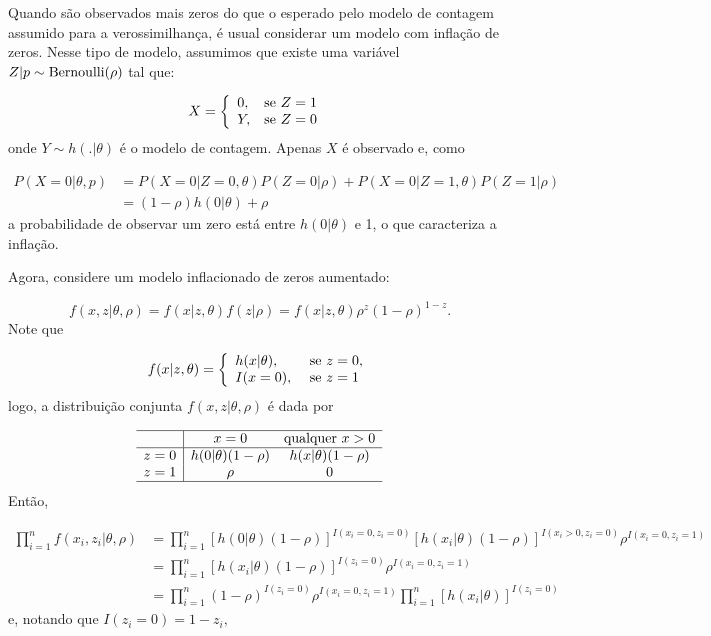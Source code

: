 \documentclass[
  letterpaper,
  DIV=11,
  numbers=noendperiod]{scrreprt}
\theoremstyle{definition}
\theoremstyle{definition}
\theoremstyle{plain}
\theoremstyle{remark}
\begin{document}
Quando são observados mais zeros do que o esperado pelo modelo de
contagem assumido para a verossimilhança, é usual considerar um modelo
com inflação de zeros. Nesse tipo de modelo, assumimos que existe uma
variável \(Z|p\sim\hbox{Bernoulli}(\rho)\) tal que:

\[X=\left\{\begin{array}{ll}0, & \hbox{se }Z=1\ \\ Y,&\hbox{se }Z=0\end{array}\right.\]
onde \(Y\sim h(.|\theta)\) é o modelo de contagem. Apenas \(X\) é
observado e, como

\[\begin{align}P(X=0|\theta,p)&=P(X=0|Z=0,\theta)P(Z=0|\rho)+P(X=0|Z=1,\theta)P(Z=1|\rho)\\&=(1-\rho)h(0|\theta)+\rho\end{align}\]
a probabilidade de observar um zero está entre \(h(0|\theta)\) e 1, o
que caracteriza a inflação.

Agora, considere um modelo inflacionado de zeros aumentado:

\[f(x,z|\theta,\rho)=f(x|z,\theta)f(z|\rho)=f(x|z,\theta)\rho^z(1-\rho)^{1-z}.\]
Note que

\[f(x|z,\theta)=\left\{
\begin{array}{ll}
h(x|\theta),&\hbox{ se }z=0,\\
I(x=0),&\hbox{ se }z=1\\
\end{array}\right.\] logo, a distribuição conjunta
\(f(x,z|\theta,\rho)\) é dada por

\[\begin{array}{c|cc}\hline & x=0 & \hbox{qualquer }x> 0 \\ \hline
z=0 & h(0|\theta)(1-\rho) & h(x|\theta)(1-\rho) \\
z=1 & \rho & 0 \\ \hline
\end{array}
\] Então,

\[\begin{align}
\prod_{i=1}^n f(x_i,z_i|\theta,\rho)&=\prod_{i=1}^n [h(0|\theta)(1-\rho)]^{I(x_i=0,z_i=0)}[h(x_i|\theta)(1-\rho)]^{I(x_i>0,z_i=0)}\rho^{I(x_i=0,z_i=1)}\\
&=\prod_{i=1}^n [h(x_i|\theta)(1-\rho)]^{I(z_i=0)}\rho^{I(x_i=0,z_i=1)}\\
&=\prod_{i=1}^n(1-\rho)^{I(z_i=0)}\rho^{I(x_i=0,z_i=1)}\prod_{i=1}^n [h(x_i|\theta)]^{I(z_i=0)}\end{align}\]
e, notando que \(I(z_i=0)=1-z_i,\)
\end{document}
